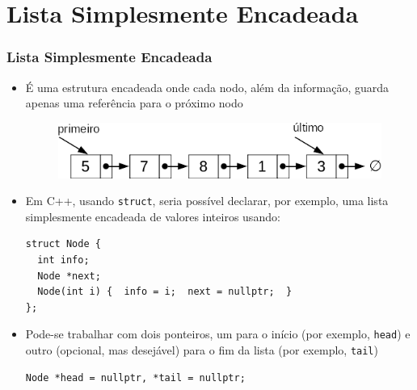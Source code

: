 \documentclass[aspectratio=169]{beamer}
\begin{document}
\section{Lista Simplesmente Encadeada}

\begin{frame}[fragile]\frametitle{Lista Simplesmente Encadeada}
\begin{itemize}
	\item É uma estrutura encadeada onde cada nodo, além da informação, guarda apenas uma referência para o próximo nodo
\begin{figure}[h]
	\centering
	\includegraphics[height=0.15\paperheight]{imagens/lista_simplesmente_encadeada.png}
\end{figure}
	\item Em C++, usando \texttt{struct}, seria possível declarar, por exemplo, uma lista simplesmente encadeada de valores inteiros usando:
\begin{lstlisting}[basicstyle=\ttfamily\scriptsize]
struct Node {
  int info;
  Node *next;
  Node(int i) {  info = i;  next = nullptr;  }
};
\end{lstlisting}
	\item Pode-se trabalhar com dois ponteiros, um para o início (por exemplo, \texttt{head}) e outro (opcional, mas desejável) para o fim da lista (por exemplo, \texttt{tail})
\begin{lstlisting}[basicstyle=\ttfamily\scriptsize]
Node *head = nullptr, *tail = nullptr;
\end{lstlisting}
\end{itemize}
\end{frame}
\end{document}
